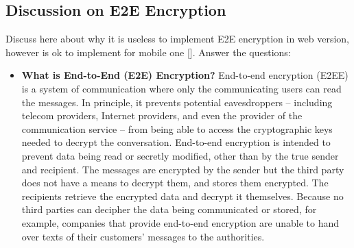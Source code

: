 \subsection{Discussion on E2E Encryption}\label{subsec:discussion-on-e2e-encryption-over-https-protocol}
Discuss here about why it is useless to implement E2E encryption in web version,
however is ok to implement for mobile one [\cite{JsMathRandom, E2eVsTLS}].
Answer the questions:
\begin{itemize}
    \item \textbf{What is End-to-End (E2E) Encryption?}
    End-to-end encryption (E2EE) is a system of communication where only the communicating users can read the messages.
    In principle, it prevents potential eavesdroppers -- including telecom providers, Internet providers,
    and even the provider of the communication service -- from being able to access the cryptographic keys needed to
    decrypt the conversation.
    End-to-end encryption is intended to prevent data being read or secretly modified, other than by the true sender and
    recipient.
    The messages are encrypted by the sender but the third party does not have a means to decrypt them, and stores them
    encrypted.
    The recipients retrieve the encrypted data and decrypt it themselves.
    Because no third parties can decipher the data being communicated or stored, for example, companies that provide
    end-to-end encryption are unable to hand over texts of their customers' messages to the authorities.


\end{itemize}
